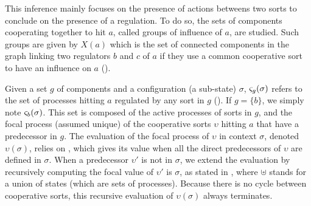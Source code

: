 This inference mainly focuses on the presence of actions betweens two sorts to conclude on the presence of a regulation.
To do so, the sets of components cooperating together to hit $a$, called groups of influence of $a$, are studied.
Such groups are given by $X(a)$ which is the set of connected components in the graph linking two regulators
$b$ and $c$ of $a$ if they use a common cooperative sort to have an influence on
$a$ ().


Given a set $g$ of components and a configuration (\ie a sub-state) $\sigma$, $\varsigma_g(\sigma)$
refers to the set of processes hitting $a$ regulated by any sort in $g$ ().
If $g=\{b\}$, we simply note $\varsigma_b(\sigma)$.
This set is composed of the active processes of sorts in $g$, and the focal process (assumed
unique) of the cooperative sorts $\upsilon$ hitting $a$ that have a predecessor in $g$.
The evaluation of the focal process of $\upsilon$ in context $\sigma$, denoted $\upsilon(\sigma)$,
relies on , which gives its value when all the direct predecessors of
$\upsilon$ are defined in $\sigma$.
When a predecessor $\upsilon'$ is not in $\sigma$, we extend the evaluation by recursively computing
the focal value of $\upsilon'$ is $\sigma$, as stated in ,
where $\uplus$ stands for a union of states (which are sets of processes).
Because there is no cycle between cooperative sorts, this recursive evaluation of $\upsilon(\sigma)$
always terminates.


